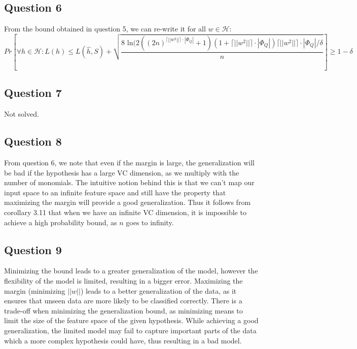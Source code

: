 \documentclass{article}
\begin{document}
\subsection{Question 6}
From the bound obtained in question 5, we can re-write it for all $w \in \mathcal{H}$:
\begin{equation}
Pr \left[ \forall h \in \mathcal{H}: L(h) \leq L(\hat{h},S)+
\sqrt{ \dfrac{8 \text{ ln} (2((2n)^{\lceil || w^2|| \rceil \cdot| \Phi_Q|}+1) (1+ \lceil || w^2|| \rceil \cdot| \Phi_Q|) \lceil || w^2|| \rceil \cdot| \Phi_Q|  / \delta}{n}} \right] \geq 1- \delta 
\end{equation} 
\subsection{Question 7}
Not solved.
\subsection{Question 8}
From question 6, we note that even if the margin is large, the generalization will be bad if the hypothesis has a large VC dimension, as we multiply with the number of monomials. The intuitive notion behind this is that we can't map our input space to an infinite feature space and still have the property that maximizing the margin will provide a good generalization. Thus it follows from corollary 3.11 that when we have an infinite VC dimension, it is impossible to achieve a high probability bound, as $n$ goes to infinity. 
\subsection{Question 9}
Minimizing the bound leads to a greater generalization of the model, however the flexibility of the model is limited, resulting in a bigger error. Maximizing the margin (minimizing $||w||$) leads to a better generalization of the data, as it ensures that unseen data are more likely to be classified correctly. There is a trade-off when minimizing the generalization bound, as minimizing means to limit the size of the feature space of the given hypothesis. While achieving a good generalization, the limited model may fail to capture important parts of the data which a more complex hypothesis could have, thus resulting in a bad model. 
\end{document}
